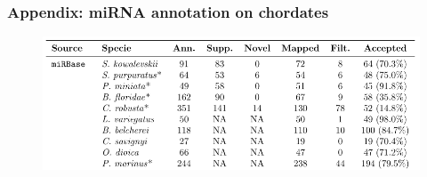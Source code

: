 \begin{frame}[t]
    \frametitle{Appendix: miRNA annotation on chordates}
    \begin{figure}[htpb]
        \centering
        \includegraphics[width=\textwidth]{Figures/support_mirbase_table.png}
        \label{fig:chordatesann}
    \end{figure}
\end{frame}
